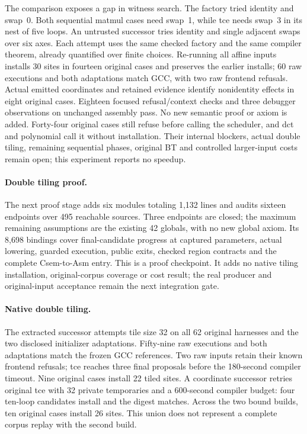 The comparison exposes a gap in witness search. The factory tried identity
and swap~0. Both sequential matmul cases need swap~1, while tce needs swap~3
in its nest of five loops. An untrusted successor tries identity and single adjacent swaps over
six axes. Each attempt uses the same checked factory and the same compiler
theorem, already quantified over finite choices. Re-running all affine inputs
installs 30 sites in fourteen original cases and preserves the earlier installs;
60 raw executions and both adaptations match GCC, with two raw frontend
refusals. Actual emitted coordinates and retained evidence identify nonidentity
effects in eight original cases. Eighteen focused refusal/context checks and
three debugger observations on unchanged assembly pass. No new semantic proof
or axiom is added. Forty-four original cases still refuse before calling the
scheduler, and dct and polynomial call it without installation. Their internal
blockers, actual double tiling, remaining sequential phases, original BT and
controlled larger-input costs remain open; this experiment reports no speedup.

\paragraph{Double tiling proof.}
The next proof stage adds six modules totaling 1,132 lines and audits sixteen
endpoints over 495 reachable sources. Three endpoints are closed; the maximum
remaining assumptions are the existing 42 globals, with no new global axiom.
Its 8,698 bindings cover final-candidate progress at captured parameters,
actual lowering, guarded execution, public exits, checked region contracts and
the complete Csem-to-Asm entry. This is a proof checkpoint. It adds no native
tiling installation, original-corpus coverage or cost result; the real producer
and original-input acceptance remain the next integration gate.

\paragraph{Native double tiling.}
The extracted successor attempts tile size 32 on all 62 original harnesses and
the two disclosed initializer adaptations. Fifty-nine raw executions and both
adaptations match the frozen GCC references. Two raw inputs retain their known
frontend refusals; tce reaches three final proposals before the 180-second
compiler timeout. Nine original cases install 22 tiled sites. A coordinate
successor retries original tce with 32 private temporaries and a 600-second
compiler budget: four ten-loop candidates install and the digest matches.
Across the two bound builds, ten original cases install 26 sites. This union
does not represent a complete corpus replay with the second build.

